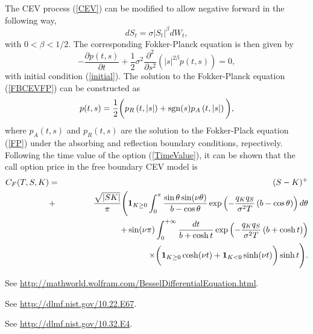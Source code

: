 \documentclass[12pt]{article}
\begin{document}
  The CEV process (\ref{CEV}) can be modified to allow negative forward in the following way,
  \begin{equation}
    dS_t=\sigma \left|S_t\right|^{\beta}dW_t,
    \label{FreeBoundaryCEV}
  \end{equation}
  with $0<\beta<1/2$. The corresponding Fokker-Planck equation is then given by
  \begin{equation}
    -\frac{\partial p(t,s)}{\partial t}+\frac{1}{2}\sigma^2\frac{\partial^2}{\partial s^2}
    \left(\left|s\right|^{2\beta}p(t,s)\right) = 0,
    \label{FBCEVFP}
  \end{equation}
  with initial condition (\ref{initial}). The solution to the Fokker-Planck equation (\ref{FBCEVFP})
  can be constructed as
  \begin{equation}
    p(t,s)=\frac{1}{2}\bigg(p_R\left(t,\left|s\right|\right)+{\rm sgn}(s)p_A\left(t,\left|s\right|\right)\bigg),
  \end{equation}
  where $p_A(t,s)$ and $p_R(t,s)$ are the solution to the Fokker-Plack equation (\ref{FP}) under
  the absorbing and reflection boundary conditions, repectively. Following the time value of the option (\ref{TimeValue}),
  it can be shown that the call option price in the free boundary CEV model is
  \begin{eqnarray}
    C_F(T,S,K) &=& (S-K)^+ \nonumber\\
             &+&\frac{\sqrt{\left|SK\right|}}{\pi}\Bigg({\bf 1}_{K\geq 0}\int_0^{\pi}\frac{\sin\theta\sin(\nu\theta)}{b-\cos\theta}
                        \exp\left(-\frac{q_Kq_S}{\sigma^2T}\left(b-\cos\theta\right)\right)d\theta\nonumber\\
             &&\quad\quad\quad\quad\quad + \sin(\nu\pi)\int_0^{+\infty}
                \frac{dt}{b+\cosh t}
       \exp\left(-\frac{q_Kq_S}{\sigma^2T}\left(b+\cosh t\right)\right)\nonumber\\
             &&\quad\quad\quad\quad\quad\quad\quad\quad\quad\quad \times 
                  \bigg({\bf 1}_{K\geq 0}\cosh(\nu t)+{\bf 1}_{K< 0}\sinh(\nu t)\bigg)\sinh t\Bigg).
  \end{eqnarray}








\begin{thebibliography}{99}
    See \url{http://mathworld.wolfram.com/BesselDifferentialEquation.html}.

    See \url{http://dlmf.nist.gov/10.22.E67}.

    See \url{http://dlmf.nist.gov/10.32.E4}.
\end{thebibliography}
\end{document}
